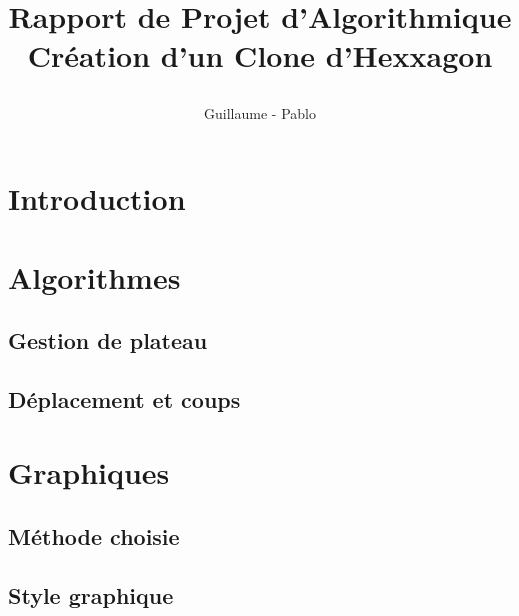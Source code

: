 \documentclass{report}
\begin{document}
\title{%
    \begin{minipage}\linewidth
        \centering
        Rapport de Projet d'Algorithmique
        \vskip 3pt
        \large Création d'un Clone d'Hexxagon
    \end{minipage}
}
\author{Guillaume  - Pablo }
\maketitle

\section{Introduction}
	
\section{Algorithmes}
	\subsection{Gestion de plateau}
	
	\subsection{Déplacement et coups}

\section{Graphiques}
	\subsection{Méthode choisie}
	\subsection{Style graphique} %
\end{document}

